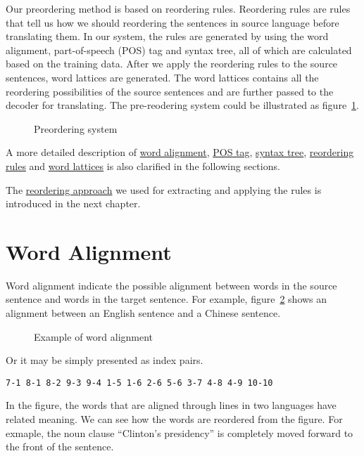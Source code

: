 Our preordering method is based on reordering rules. Reordering rules are rules that tell us how we should reordering the sentences in source language before translating them. In our system, the rules are generated by using the word alignment, part-of-speech (POS) tag and syntax tree, all of which are calculated based on the training data. After we apply the reordering rules to the source sentences, word lattices are generated. The word lattices contains all the reordering possibilities of the source sentences and are further passed to the decoder for translating. The pre-reodering system could be illustrated as figure~\ref{prereordering}.

\begin{figure}
\centering

\caption{Preordering system}
\label{prereordering}
\end{figure}

A more detailed description of \hyperref[ch:Foundations:sec:Alignment]{word alignment}, \hyperref[ch:Foundations:sec:PosTag]{POS tag}, \hyperref[ch:Foundations:sec:SyntacticTree]{syntax tree},
\hyperref[ch:Foundations:sec:types]{reordering rules} and 
\hyperref[ch:Foundations:sec:Lattices]{word lattices} is also clarified in the following sections.

The \hyperref[ch:ReorderingApproach]{reordering approach} we used for extracting and applying the rules is introduced in the next chapter.

\section{Word Alignment}
\label{ch:Foundations:sec:Alignment}

Word alignment indicate the possible alignment between words in the source sentence and words in the target sentence. For example, figure~\ref{alignment} shows an alignment between an English sentence and a Chinese sentence.

\begin{figure}[H]
\centering

\caption{Example of word alignment}
\label{alignment}
\end{figure}
Or it may be simply presented as index pairs.
\begin{center}
\verb|7-1 8-1 8-2 9-3 9-4 1-5 1-6 2-6 5-6 3-7 4-8 4-9 10-10|
\end{center}

In the figure, the words that are aligned through lines in two languages have related meaning. We can see how the words are reordered from the figure. For exmaple, the noun clause ``Clinton's presidency'' is completely moved forward to the front of the sentence.

